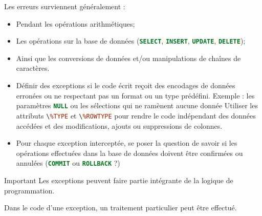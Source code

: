 \documentclass[10pt]{beamer}
\begin{document}
\begin{frame}{\secname}
    Les erreurs surviennent généralement :
    \begin{itemize}
        \item Pendant les opérations arithmétiques;
        \item Les opérations sur la base de données (\lstinline[language=sql]!SELECT!, \lstinline[language=sql]!INSERT!, \lstinline[language=sql]!UPDATE!, \lstinline[language=sql]!DELETE!);
        \item Ainsi que les conversions de données et/ou manipulations de chaînes de caractères.
    \end{itemize}
\end{frame}

\begin{frame}{\secname}
    \begin{itemize}
        \item Définir des exceptions si le code écrit reçoit des encodages de données erronées ou ne respectant pas un format ou un type prédéfini.  Exemple : les paramètres \lstinline[language=sql]!NULL! ou les sélections qui ne ramènent aucune donnée
              Utiliser les attributs \lstinline[language=sql]!\%TYPE! et \lstinline[language=sql]!\%ROWTYPE! pour rendre le code indépendant des données accédées et des modifications, ajouts ou suppressions de colonnes.
        \item Pour chaque exception interceptée, se poser la question de savoir si les opérations effectuées dans la base de données doivent être confirmées ou annulées (\lstinline[language=sql]!COMMIT! ou \lstinline[language=sql]!ROLLBACK! ?)
    \end{itemize}
\end{frame}

\begin{frame}{\secname}
    \begin{alertblock}{Important}
        Les exceptions peuvent faire partie intégrante de la logique de programmation.
    \end{alertblock}
    Dans le code d'une exception, un traitement particulier peut être effectué.
\end{frame}

\begin{frame}{\secname}
    
\end{frame}
\end{document}
